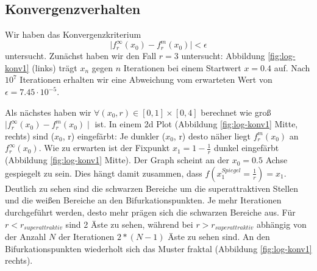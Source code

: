 \documentclass[11,5pt, twoside]{article}
\begin{document}
\subsection{Konvergenzverhalten}
Wir haben das Konvergenzkriterium 
\begin{equation}
\mid f^{\infty}_r(x_0)-f^{m}_r(x_0)\mid < \epsilon
\end{equation}
untersucht. 
Zunächst haben wir den Fall $r=3$ untersucht: Abbildung \ref{fig:log-konv1} (links) trägt $x_n$ gegen $n$ Iterationen bei einem Startwert $x=0.4$ auf. Nach $10^7$ Iterationen erhalten wir eine Abweichung vom erwarteten Wert von $\epsilon=7.45 \cdot 10^{-5}$.


Als nächstes haben wir $\forall (x_0, r) \in [0,1] \times [0,4]$  berechnet wie groß $\mid f^{\infty}_r(x_0)-f^{m}_r(x_0)\mid $ ist. 
In einem 2d Plot (Abbildung \ref{fig:log-konv1} Mitte, rechts) sind ($x_0$, r) eingefärbt: Je dunkler ($x_0$, r) desto näher liegt $f^{m}_r(x_0)$ an $f^{\infty}_r(x_0)$. 
Wie zu erwarten ist der Fixpunkt $x_1=1-\frac{1}{r}$ dunkel eingefärbt (Abbildung \ref{fig:log-konv1} Mitte). Der Graph scheint an der $x_0=0.5$ Achse gespiegelt zu sein. Dies hängt damit zusammen, dass $f(x^{Spiegel}_{1}=\frac{1}{r}) = x_1$. 
Deutlich zu sehen sind die schwarzen Bereiche um die superattraktiven Stellen und die weißen Bereiche an den Bifurkationspunkten. Je mehr Iterationen durchgeführt werden, desto mehr prägen sich die schwarzen Bereiche aus. Für $r < r_{superattraktiv}$ sind 2 Äste zu sehen, während bei $r > r_{superattraktiv}$ abhängig von der Anzahl $N$ der Iterationen $2*(N-1)$ Äste zu sehen sind. An den Bifurkationspunkten wiederholt sich das Muster fraktal (Abbildung \ref{fig:log-konv1} rechts). 
\end{document}

